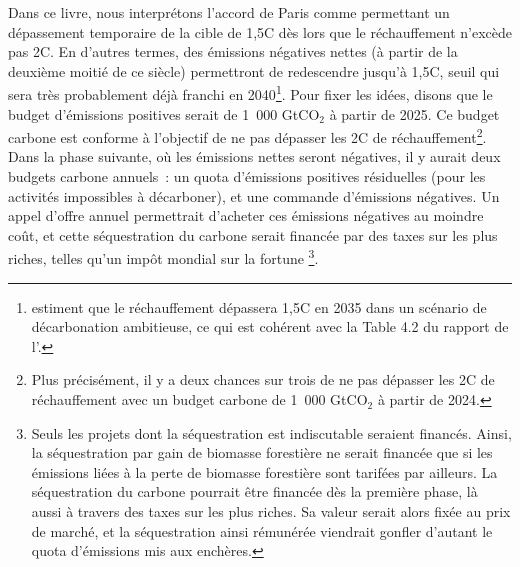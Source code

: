 \documentclass[a5paper,french,openany]{memoir}
\begin{document}
Dans ce livre, nous interprétons l'accord de Paris comme permettant un dépassement temporaire de la cible de 1,5\textdegree{}C dès lors que le réchauffement n'excède pas 2\textdegree{}C. En d'autres termes, des émissions négatives nettes (à partir de la deuxième moitié de ce siècle) permettront de redescendre jusqu'à 1,5\textdegree{}C, seuil qui sera très probablement déjà franchi en 2040\footnote{\citet{diffenbaugh_data-driven_2023} estiment que le réchauffement dépassera 1,5\textdegree{}C en 2035 dans un scénario de décarbonation ambitieuse, ce qui est cohérent avec la Table 4.2 du rapport de l'\citet{ipcc_climate_2021}.}. 
Pour fixer les idées, disons que le budget d'émissions positives serait de 1~000 GtCO$_\text{2}$ à partir de 2025. Ce budget carbone est conforme à l'objectif de ne pas dépasser les 2\textdegree{}C de réchauffement\footnote{Plus précisément, il y a deux chances sur trois de ne pas dépasser les 2\textdegree{}C de réchauffement avec un budget carbone de 1~000 GtCO$_\text{2}$ à partir de 2024.}. 
Dans la phase suivante, où les émissions nettes seront négatives, il y aurait deux budgets carbone annuels~: un quota d'émissions positives résiduelles (pour les activités impossibles à décarboner), et une commande d'émissions négatives. Un appel d'offre annuel permettrait d'acheter ces émissions négatives au moindre coût, et cette séquestration du carbone serait financée par des taxes sur les plus riches, telles qu'un impôt mondial sur la fortune
\footnote{Seuls les projets dont la séquestration est indiscutable seraient financés. Ainsi, la séquestration par gain de biomasse forestière ne serait financée que si les émissions liées à la perte de biomasse forestière sont tarifées par ailleurs. La séquestration du carbone pourrait être financée dès la première phase, là aussi à travers des taxes sur les plus riches. Sa valeur serait alors fixée au prix de marché, et la séquestration ainsi rémunérée viendrait gonfler d'autant le quota d'émissions mis aux enchères.}. %
\end{document}
